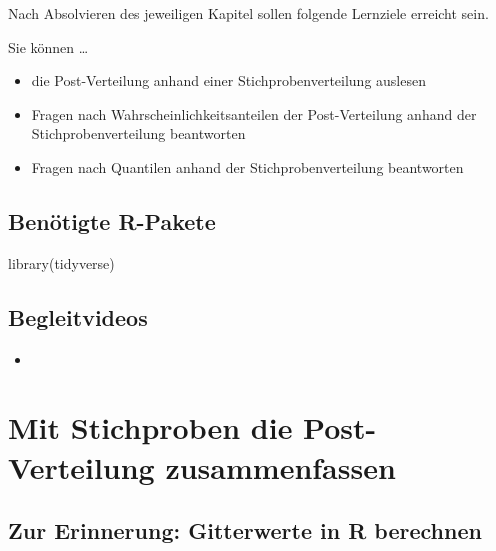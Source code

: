 \documentclass[
  a4paper,
  DIV=11]{scrreprt}
\newenvironment{Shaded}{\begin{snugshade}}{\end{snugshade}}
\newcommand{\FunctionTok}[1]{\textcolor[rgb]{0.28,0.35,0.67}{#1}}
\newcommand{\NormalTok}[1]{\textcolor[rgb]{0.00,0.23,0.31}{#1}}
\providecommand{\tightlist}{%
  \setlength{\itemsep}{0pt}\setlength{\parskip}{0pt}}\usepackage{longtable,booktabs,array}
\theoremstyle{definition}
\theoremstyle{remark}
\begin{document}
Nach Absolvieren des jeweiligen Kapitel sollen folgende Lernziele
erreicht sein.

Sie können \ldots{}

\begin{itemize}
\tightlist
\item
  die Post-Verteilung anhand einer Stichprobenverteilung auslesen
\item
  Fragen nach Wahrscheinlichkeitsanteilen der Post-Verteilung anhand der
  Stichprobenverteilung beantworten
\item
  Fragen nach Quantilen anhand der Stichprobenverteilung beantworten
\end{itemize}

\hypertarget{benuxf6tigte-r-pakete-2}{%
\subsection{Benötigte R-Pakete}\label{benuxf6tigte-r-pakete-2}}

\begin{Shaded}
\begin{Highlighting}[]
\FunctionTok{library}\NormalTok{(tidyverse)}
\end{Highlighting}
\end{Shaded}

\hypertarget{begleitvideos-4}{%
\subsection{Begleitvideos}\label{begleitvideos-4}}

\begin{itemize}
\tightlist
\item
  \href{}{}
\end{itemize}

\hypertarget{mit-stichproben-die-post-verteilung-zusammenfassen}{%
\section{Mit Stichproben die Post-Verteilung
zusammenfassen}\label{mit-stichproben-die-post-verteilung-zusammenfassen}}

\hypertarget{zur-erinnerung-gitterwerte-in-r-berechnen}{%
\subsection{Zur Erinnerung: Gitterwerte in R
berechnen}\label{zur-erinnerung-gitterwerte-in-r-berechnen}}
\end{document}
